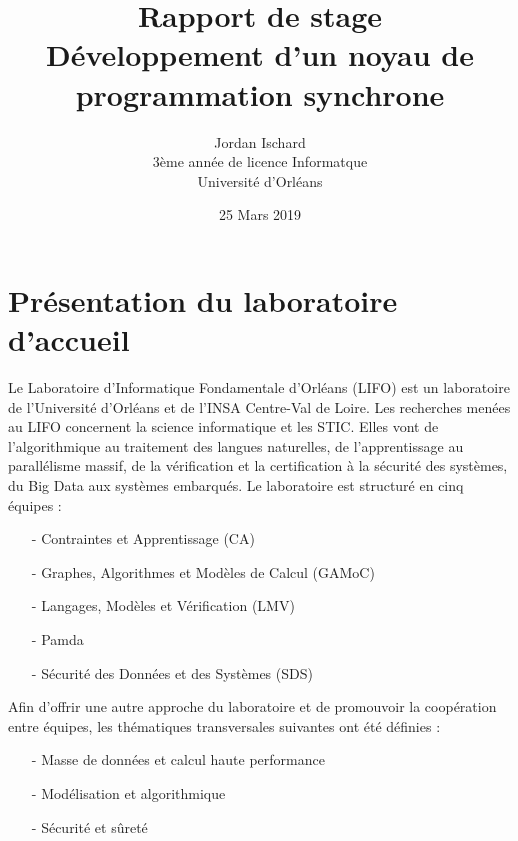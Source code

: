 \documentclass[10pt,a4paper]{report}
\begin{document}
	
	\title{\textbf{Rapport de stage \\ Développement d'un noyau de programmation synchrone}}
	\date{25 Mars 2019}
	\author{Jordan Ischard\\3ème année de licence Informatque \\ Université d'Orléans}
	\maketitle
	
	\tableofcontents
	\newpage
	
	\section*{Présentation du laboratoire d'accueil}
	Le Laboratoire d'Informatique Fondamentale d'Orléans (LIFO) est un laboratoire de l'Université d'Orléans et de l'INSA Centre-Val de Loire. 
	Les recherches menées au LIFO concernent la science informatique et les STIC. Elles vont de l'algorithmique au traitement des langues
	naturelles, de l'apprentissage au parallélisme massif, de la vérification et la certification à la sécurité des systèmes, du Big Data aux
	systèmes embarqués. Le laboratoire est structuré en cinq équipes :
	\begin{enumerate}
		\item[-] Contraintes et Apprentissage (CA)
		\item[-] Graphes, Algorithmes et Modèles de Calcul (GAMoC)
		\item[-] Langages, Modèles et Vérification (LMV)
		\item[-] Pamda
		\item[-] Sécurité des Données et des Systèmes (SDS)
	\end{enumerate}
	\medbreak
	
	Afin d'offrir une autre approche du laboratoire et de promouvoir la coopération entre équipes, les thématiques transversales suivantes ont été définies :
	\begin{enumerate}
		\item[-] Masse de données et calcul haute performance
		\item[-] Modélisation et algorithmique
		\item[-] Sécurité et sûreté
	\end{enumerate}
	\medbreak
	
\end{document}
